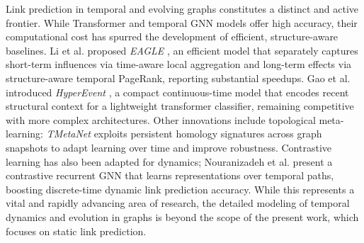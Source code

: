 \documentclass[pdflatex,sn-mathphys-num]{sn-jnl}%
\theoremstyle{thmstyleone}%
\theoremstyle{thmstyletwo}%
\theoremstyle{thmstylethree}%
\theoremstyle{plain} %
\theoremstyle{definition} %
\theoremstyle{remark} %
\theoremstyle{plain} %
\begin{document}
Link prediction in temporal and evolving graphs constitutes a distinct and active frontier. 
While Transformer and temporal GNN models offer high accuracy, their computational cost has spurred the development of efficient, structure-aware baselines. Li et al. proposed \textit{EAGLE} \cite{Li2025EAGLE}, an efficient model that separately captures short-term influences via time-aware local aggregation and long-term effects via structure-aware temporal PageRank, reporting substantial speedups. 
Gao et al. introduced \textit{HyperEvent} \cite{Gao2025HyperEvent}, a compact continuous-time model that encodes recent structural context for a lightweight transformer classifier, remaining competitive with more complex architectures. 
Other innovations include topological meta-learning: \textit{TMetaNet} \cite{Li2025TMetaNet} exploits persistent homology signatures across graph snapshots to adapt learning over time and improve robustness. 
Contrastive learning has also been adapted for dynamics; Nouranizadeh et al. \cite{Nouranizadeh2024Contrastive} present a contrastive recurrent GNN that learns representations over temporal paths, boosting discrete-time dynamic link prediction accuracy.
While this represents a vital and rapidly advancing area of research, the detailed modeling of temporal dynamics and evolution in graphs is beyond the scope of the present work, which focuses on static link prediction.

\end{document}
